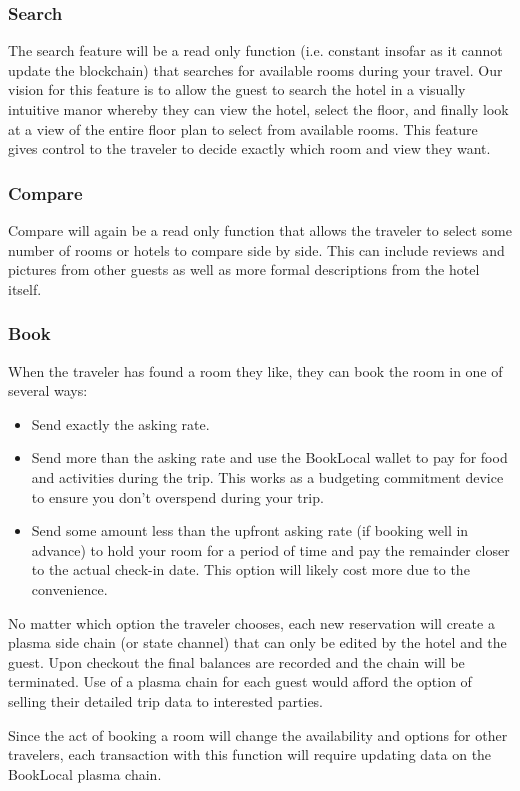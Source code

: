\documentclass{article}
\begin{document}
\subsubsection{Search}
The search feature will be a read only function (i.e. constant insofar as it cannot update the blockchain) that searches for available rooms during your travel. Our vision for this feature is to allow the guest to search the hotel in a visually intuitive manor whereby they can view the hotel, select the floor, and finally look at a view of the entire floor plan to select from available rooms. This feature gives control to the traveler to decide exactly which room and view they want. 

\subsubsection{Compare}
Compare will again be a read only function that allows the traveler to select some number of rooms or hotels to compare side by side. This can include reviews and pictures from other guests as well as more formal descriptions from the hotel itself.

\subsubsection{Book}
When the traveler has found a room they like, they can book the room in one of several ways: 
\begin{itemize}
 \item Send exactly the asking rate.
 \item Send more than the asking rate and use the BookLocal wallet to pay for food and activities during the trip. This works as a budgeting commitment device to ensure you don't overspend during your trip. 
 \item Send some amount less than the upfront asking rate (if booking well in advance) to hold your room for a period of time and pay the remainder closer to the actual check-in date. This option will likely cost more due to the convenience. 
\end{itemize}
No matter which option the traveler chooses, each new reservation will create a plasma side chain (or state channel) that can only be edited by the hotel and the guest. Upon checkout the final balances are recorded and the chain will be terminated. Use of a plasma chain for each guest would afford the option of selling their detailed trip data to interested parties. 

\begin{flushleft}
Since the act of booking a room will change the availability and options for other travelers, each transaction with this function will require updating data on the BookLocal plasma chain. 
\end{flushleft}
\end{document}
